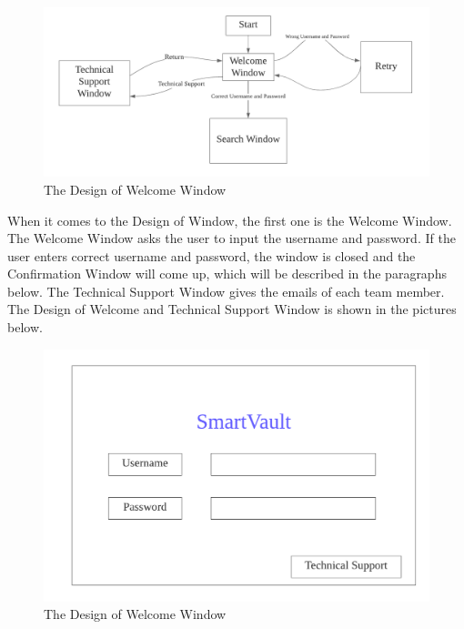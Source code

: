 \documentclass[12pt, titlepage]{article}
\begin{document}
\begin{figure}[H]
    \centering
    \includegraphics[scale=0.6]{FSM1.png}
    \caption{The Design of Welcome Window}
\end{figure}

When it comes to the Design of Window, the first one is the Welcome Window. The Welcome Window asks the user to input the username and password. If the user enters correct username and password, the window is closed and the Confirmation Window will come up, which will be described in the paragraphs below. The Technical Support Window gives the emails of each team member. The Design of Welcome and Technical Support Window is shown in the pictures below. 

\begin{figure}[H]
    \centering
    \includegraphics[scale=0.6]{Welcome.png}
    \caption{The Design of Welcome Window}
\end{figure}
\end{document}
